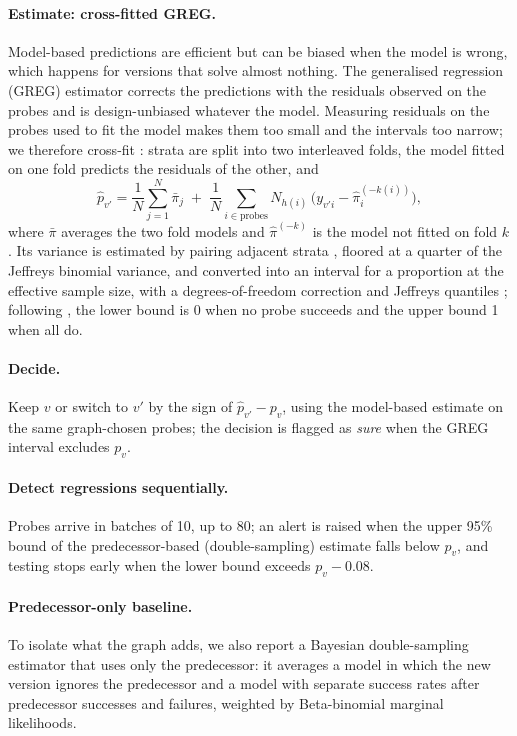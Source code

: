 \documentclass[11pt]{article}
\begin{document}
\paragraph{Estimate: cross-fitted GREG.} Model-based predictions are efficient but can be biased when the model
is wrong, which happens for versions that solve almost nothing. The generalised regression (GREG) estimator
\citep{sarndal1992} corrects the predictions with the residuals observed on the probes and is design-unbiased
whatever the model. Measuring residuals on the probes used to fit the model makes them too small and the intervals
too narrow; we therefore cross-fit \citep{zrnic2024cross}: strata are split into two interleaved folds, the model
fitted on one fold predicts the residuals of the other, and
\begin{equation}
\hat p_{v'} = \frac1N\sum_{j=1}^N \bar\pi_j \;+\; \frac1N\sum_{i\in\text{probes}} N_{h(i)}\,\bigl(y_{v'i}-\hat\pi^{(-k(i))}_i\bigr),
\end{equation}
where $\bar\pi$ averages the two fold models and $\hat\pi^{(-k)}$ is the model not fitted on fold $k$. Its variance
is estimated by pairing adjacent strata \citep[\S5A.12]{cochran1977}, floored at a quarter of the Jeffreys binomial
variance, and converted into an interval for a proportion at the effective sample size, with a degrees-of-freedom
correction and Jeffreys quantiles \citep{korn1998}; following \citet{brown2001}, the lower bound is 0 when no probe
succeeds and the upper bound 1 when all do.

\paragraph{Decide.} Keep $v$ or switch to $v'$ by the sign of $\hat p_{v'}-p_v$, using the model-based estimate on
the same graph-chosen probes; the decision is flagged as \emph{sure} when the GREG interval excludes $p_v$.

\paragraph{Detect regressions sequentially.} Probes arrive in batches of 10, up to 80; an alert is raised when the
upper 95\% bound of the predecessor-based (double-sampling) estimate falls below $p_v$, and testing stops early when
the lower bound exceeds $p_v-0.08$.

\paragraph{Predecessor-only baseline.} To isolate what the graph adds, we also report a Bayesian double-sampling
estimator that uses only the predecessor: it averages a model in which the new version ignores the predecessor and
a model with separate success rates after predecessor successes and failures, weighted by Beta-binomial marginal
likelihoods.
\end{document}
